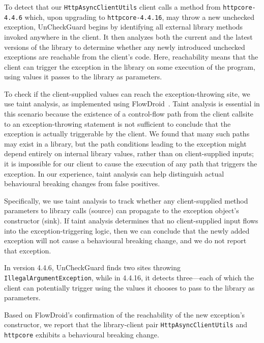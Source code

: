 To detect that our \texttt{HttpAsyncClientUtils} client calls a method from \texttt{httpcore-4.4.6} which, upon upgrading to \texttt{httpcore-4.4.16}, may throw a new unchecked exception, UnCheckGuard begins by identifying all external library methods invoked anywhere in the client. It then analyzes both the current and the latest versions of the library to determine whether any newly introduced unchecked exceptions are reachable from the client's code. Here, reachability means that the client can trigger the exception in the library on some execution of the program, using values it passes to the library as parameters.

To check if the client-supplied values can reach the exception-throwing site, we use taint analysis, as implemented using FlowDroid~\cite{Arzt14:_flowdroid}. Taint analysis is essential in this scenario because the existence of a control-flow path from the client callsite to an exception-throwing statement is not sufficient to conclude that the exception is actually triggerable by the client. We found that many such paths may exist in a library, but the path conditions leading to the exception might depend entirely on internal library values, rather than on client-supplied inputs; it is impossible for our client to cause the execution of any path that triggers the exception. In our experience, taint analysis can help distinguish actual behavioural breaking changes from false positives.

Specifically, we use taint analysis to track whether any client-supplied method parameters to library calls (source) can propagate to the exception object's constructor (sink). If taint analysis determines that no client-supplied input flows into the exception-triggering logic, then we can conclude that the newly added exception will not cause a behavioural breaking change, and we do not report that exception.

In version 4.4.6, UnCheckGuard finds two sites throwing \texttt{IllegalArgumentException}, while in 4.4.16, it detects three—each of which the client can potentially trigger using the values it chooses to pass to the library as parameters.

Based on FlowDroid's confirmation of the reachability of the new exception's constructor, we report that the library-client pair \texttt{HttpAsyncClientUtils} and \texttt{httpcore} exhibits a behavioural breaking change.


